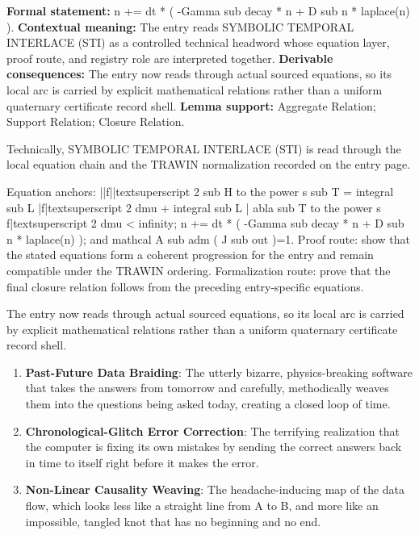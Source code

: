 \begingroup\footnotesize\setlength{\emergencystretch}{3em}\sloppy
\textbf{Formal statement:} n += dt * ( -Gamma sub decay * n + D sub n * laplace(n) ). \textbf{Contextual meaning:} The entry reads SYMBOLIC TEMPORAL INTERLACE (STI) as a controlled technical headword whose equation layer, proof route, and registry role are interpreted together. \textbf{Derivable consequences:} The entry now reads through actual sourced equations, so its local arc is carried by explicit mathematical relations rather than a uniform quaternary certificate record shell. \textbf{Lemma support:} Aggregate Relation; Support Relation; Closure Relation.\par
\endgroup

Technically, SYMBOLIC TEMPORAL INTERLACE (STI) is read through the local equation chain and the TRAWIN normalization recorded on the entry page.

Equation anchors: ||f||textsuperscript 2 sub H to the power s sub T = integral sub L |f|textsuperscript 2 dmu + integral sub L | abla sub T to the power s f|textsuperscript 2 dmu < infinity; n += dt * ( -Gamma sub decay * n + D sub n * laplace(n) ); and mathcal A sub adm ( J sub out )=1. Proof route: show that the stated equations form a coherent progression for the entry and remain compatible under the TRAWIN ordering. Formalization route: prove that the final closure relation follows from the preceding entry-specific equations.

The entry now reads through actual sourced equations, so its local arc is carried by explicit mathematical relations rather than a uniform quaternary certificate record shell.
\endgroup

\begin{enumerate}[leftmargin=1.6em,itemsep=6pt,topsep=4pt]
\item \textbf{Past-Future Data Braiding}: The utterly bizarre, physics-breaking software that takes the answers from tomorrow and carefully, methodically weaves them into the questions being asked today, creating a closed loop of time.
\item \textbf{Chronological-Glitch Error Correction}: The terrifying realization that the computer is fixing its own mistakes by sending the correct answers back in time to itself right before it makes the error.
\item \textbf{Non-Linear Causality Weaving}: The headache-inducing map of the data flow, which looks less like a straight line from A to B, and more like an impossible, tangled knot that has no beginning and no end.
\end{enumerate}

